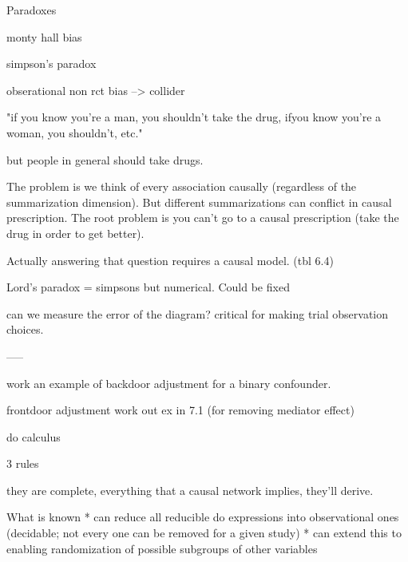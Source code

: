 \documentclass{article}
\begin{document}
Paradoxes

monty hall bias

simpson's paradox

obserational non rct bias --> collider

"if you know you're a man, you shouldn't take the drug, ifyou know you're a woman, you shouldn't, etc."

but people in general should take drugs.

The problem is we think of every association causally (regardless of the summarization dimension). But different summarizations can conflict in causal prescription. The root problem is you can't go to a causal prescription (take the drug in order to get better).

Actually answering that question requires a causal model. (tbl 6.4)

Lord's paradox = simpsons but numerical. Could be fixed

can we measure the error of the diagram? critical for making trial observation choices.

-----

work an example of backdoor adjustment for a binary confounder.

frontdoor adjustment work out ex  in 7.1 (for removing mediator effect)



do calculus

3 rules

they are complete, everything that a causal network implies, they'll derive.

What is known
* can reduce all reducible  do expressions into observational ones (decidable; not every one can be removed for a given study)
* can extend this to enabling randomization of possible subgroups of other variables
\end{document}
